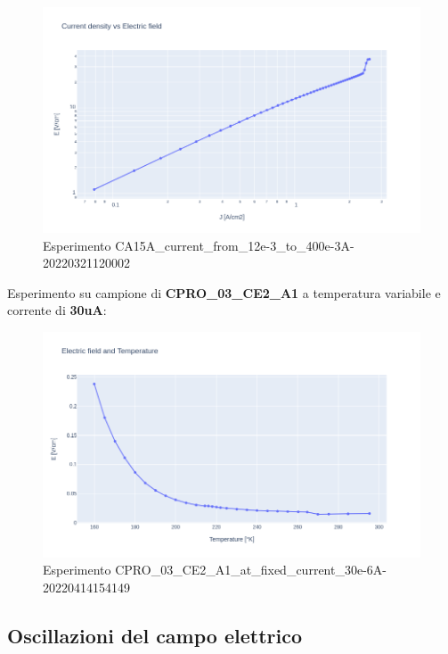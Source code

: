 \documentclass[11pt]{article}
\begin{document}
\begin{figure}
\centering
\includegraphics{CA15A_current_from_12e-3_to_400e-3A-20220321120002.png}
\caption{Esperimento
CA15A\_current\_from\_12e-3\_to\_400e-3A-20220321120002}
\end{figure}

Esperimento su campione di \textbf{CPRO\_03\_CE2\_A1} a temperatura
variabile e corrente di \textbf{30uA}:

\begin{figure}
\centering
\includegraphics{CPRO_03_CE2_A1_at_fixed_current_30e-6A-20220414154149.png}
\caption{Esperimento
CPRO\_03\_CE2\_A1\_at\_fixed\_current\_30e-6A-20220414154149}
\end{figure}

    \hypertarget{oscillazioni-del-campo-elettrico}{%
\subsection{Oscillazioni del campo
elettrico}\label{oscillazioni-del-campo-elettrico}}
\end{document}
